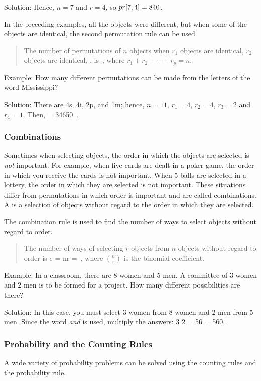 Solution: Hence, $n = 7$ and $r = 4$, so $pr\!\left[{7,4}\right] = 840$.

In the preceding examples, all the objects were different, but when some of the objects are identical, the second permutation rule can be used.
\begin{quote}
The number of permutations of $n$ objects when $r_1$ objects are identical, $r_2$ objects are identical, \etc. is
\beq
{}\,,
\eeq
where $r_1 + r_2 + \dotsb + r_p = n$.
\end{quote}

Example: How many different permutations can be made from the letters of the word Mississippi? 

Solution: There are 4s, 4i, 2p, and 1m; hence, $n = 11$, $r_1 = 4$, $r_2 = 4$, $r_3 = 2$ and $r_4 = 1$. Then,
\beq
{} = \num{34 650} \,.
\eeq


\subsubsection{Combinations}
Sometimes when selecting objects, the order in which the objects are selected is \emph{not} important. For example, when five cards are dealt in a poker game, the order in which you receive the cards is not important. When 5 balls are selected in a lottery, the order in which they are selected is not important. These situations differ from permutations in which order is important and are called combinations. A  is a selection of objects without regard to the order in which they are selected.

The combination rule is used to find the number of ways to select objects without regard to order.
\begin{quote}
The number of ways of selecting $r$ objects from $n$ objects without regard to order is
\beq
c = \binom nr = \,,
\eeq
where $\binom nr$ is the binomial coefficient.
\end{quote}

Example: In a classroom, there are 8 women and 5 men. A committee of 3 women and 2 men is to be formed for a project. How many different possibilities are there?

Solution: In this case, you must select 3 women from 8 women and 2 men from 5 men. Since the word \emph{and} is used, multiply the answers:
\beq
{} 3 2 = 56 = 560\,.
\eeq


\subsubsection{Probability and the Counting Rules}
A wide variety of probability problems can be solved using the counting rules and the probability rule.

